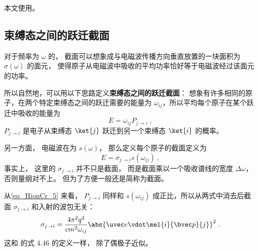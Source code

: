 
本文使用。

\subsection{束缚态之间的跃迁截面}
对于频率为 $\omega$ 的， 截面可以想象成与电磁波传播方向垂直放置的一块面积为 $\sigma(\omega)$ 的面元， 使得原子从电磁波中吸收的平均功率恰好等于电磁波经过该面元的功率。

所以自然地，可以用以下思路定义\textbf{束缚态之间的跃迁截面}： 想象有许多相同的原子，在两个特定束缚态之间的跃迁需要的能量为 $\omega_{ij}$，所以平均每个原子在某个跃迁中吸收的能量为
\begin{equation}
E = \omega_{ij}P_{j\to i}~,
\end{equation}
$P_{j\to i}$ 是电子从束缚态 $\ket{j}$ 跃迁到另一个束缚态 $\ket{i}$ 的概率。

另一方面， 电磁波在为 $s(\omega)$， 那么定义每个原子的截面定义为
\begin{equation}
E = \sigma_{j\to i} s(\omega_{ij})~,
\end{equation}
事实上， 这里的 $\sigma_{j\to i}$ 并不只是截面， 而是截面乘以一个吸收谱线的宽度 $\Delta \omega$， 否则量纲对不上。 但为了方便一般还是简称为截面。

从\autoref{eq_HionCr_5}  来看， $P_{j\to i}$ 同样和 $s(\omega_{ij})$ 成正比，所以从两式中消去后截面 $\sigma_{j\to i}$ 和入射的波包无关：
\begin{equation}
\sigma_{j\to i} = \frac{4\pi^2 q^2}{c m^2 \omega_{ij}} \abs{\uvec e \vdot\mel{i}{\bvec p}{j}}^2~.
\end{equation}
这和 \cite{Bransden} 的式 4.46 的定义一样， 除了偶极子近似。

